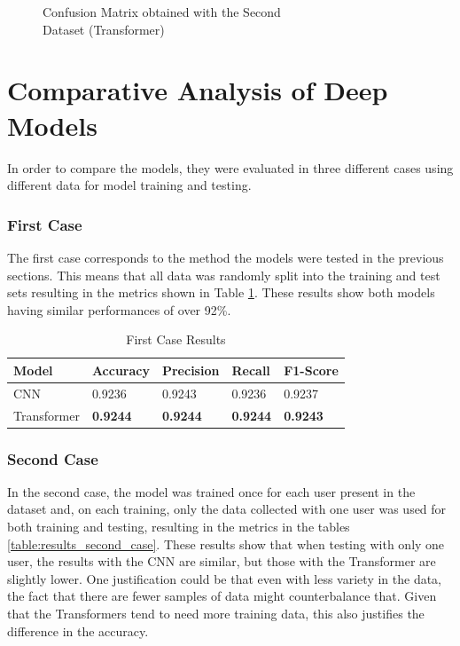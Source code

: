 \begin{figure}[H]
    \centering
    {\fontsize{10}{12}\selectfont}
    \caption[Confusion Matrix obtained with the Second Dataset (Transformer)]{Confusion Matrix obtained with the Second\\Dataset (Transformer)}
    \label{fig:transformer_dataset2_confusion_matrix}
\end{figure}

\section{Comparative Analysis of Deep Models}

In order to compare the models, they were evaluated in three different cases using different data for model training and testing.

\subsubsection{First Case}

The first case corresponds to the method the models were tested in the previous sections. This means that all data was randomly split into the training and test sets resulting in the metrics shown in Table \ref{table:results_first_case}. These results show both models having similar performances of over 92\%.

\begin{table}[H]
    \centering
    \caption{First Case Results}
    \label{table:results_first_case}
    \begin{tabular}{|l|l|l|l|l|}
        \hline
        Model & Accuracy & Precision & Recall & F1-Score \\
        \hline
        CNN & 0.9236 & 0.9243 & 0.9236 & 0.9237 \\
        \hline
        Transformer & \textbf{0.9244} & \textbf{0.9244} & \textbf{0.9244} & \textbf{0.9243} \\
        \hline
    \end{tabular}
\end{table}

\subsubsection{Second Case}

In the second case, the model was trained once for each user present in the dataset and, on each training, only the data collected with one user was used for both training and testing, resulting in the metrics in the tables \ref{table:results_second_case}. These results show that when testing with only one user, the results with the CNN are similar, but those with the Transformer are slightly lower. One justification could be that even with less variety in the data, the fact that there are fewer samples of data might counterbalance that. Given that the Transformers tend to need more training data, this also justifies the difference in the accuracy.

